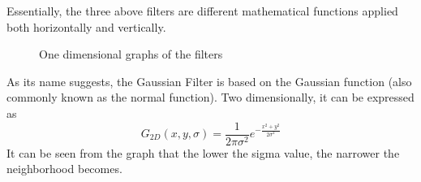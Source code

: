 \documentclass[twoside,a4paper,article]{combine}
\begin{document}
Essentially, the three above filters are different mathematical functions applied both horizontally and vertically.\\
\begin{minipage}{\textwidth}\begin{figure}[H]
    \captionsetup{justification=centering}
    \centering
    \caption{One dimensional graphs of the filters}
    \label{fig:graph}
\end{figure}\end{minipage}
As its name suggests, the Gaussian Filter is based on the Gaussian function (also commonly known as the normal function).
Two dimensionally, it can be expressed as \cite{MISRA2020289}
\[
    G_{2D}(x, y, \sigma) = \frac{1}{2\pi\sigma^2}e^{-\frac{x^2 + y^2}{2\sigma^2}}
\]
It can be seen from the graph that the lower the sigma value, the narrower the neighborhood becomes. 
\end{document}
